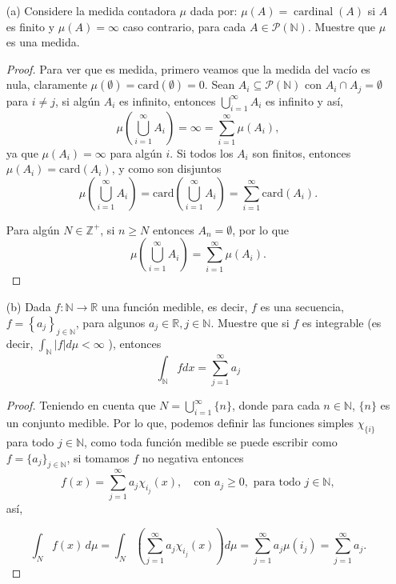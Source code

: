 \begin{itemize}
\begin{itemize}
\item[(a)] Considere la medida contadora $\mu$ dada por: $\mu(A)=\operatorname{cardinal}(A)$ si $A$ es finito y $\mu(A)=\infty$ caso contrario, para cada $A \in \mathcal{P}(\mathbb{N})$. Muestre que $\mu$ es una medida.
\begin{proof}
Para ver que es medida, primero veamos que la medida del vacío es nula, claramente $\mu(\emptyset) = \text{card}(\emptyset) = 0.$ Sean \( A_i \subseteq \mathcal{P}(\mathbb{N}) \) con \( A_i \cap A_j = \emptyset \) para \( i \neq j \), si algún \( A_i \) es infinito, entonces \( \bigcup_{i=1}^{\infty} A_i \) es infinito y así,
\[ \mu\left(\bigcup_{i=1}^{\infty} A_i\right) = \infty = \sum_{i=1}^{\infty} \mu(A_i), \]
ya que \( \mu(A_i) = \infty \) para algún \( i \). Si  todos los \( A_i \) son finitos, entonces \( \mu(A_i) = \text{card}(A_i) \), y como son disjuntos
\[ \mu\left(\bigcup_{i=1}^{\infty} A_i\right) = \text{card}\left(\bigcup_{i=1}^{\infty} A_i\right) = \sum_{i=1}^{\infty} \text{card}(A_i). \]

Para algún \( N \in \mathbb{Z}^+ \), si \( n \geq N \) entonces \( A_n = \emptyset \), por lo que
\[ \mu\left(\bigcup_{i=1}^{\infty} A_i\right)= \sum_{i=1}^{\infty} \mu(A_i). \]
              
\end{proof}
                

\item[(b)] Dada $f: \mathbb{N} \rightarrow \mathbb{R}$ una función medible, es decir, $f$ es una secuencia, $f=\left\{a_j\right\}_{j \in \mathbb{N}}$, para algunos $a_j \in \mathbb{R}, j \in \mathbb{N}$. Muestre que si $f$ es integrable (es decir, $\int_{\mathbb{N}}|f| d \mu<\infty$ ), entonces
$$
\int_{\mathbb{N}} f d x=\sum_{j=1}^{\infty} a_j
$$
\begin{proof}

Teniendo en cuenta que \( N = \bigcup^{\infty}_{i=1} \{n\} \), donde para cada \( n \in \mathbb{N} \), \( \{n\} \) es un conjunto medible. Por lo que, podemos definir las funciones simples \( \chi_{\{i\}} \) para todo \( j \in \mathbb{N} \), como toda función medible se puede escribir como \( f = \{a_j\}_{j \in \mathbb{N}} \), si tomamos \( f \) no negativa entonces
\[
f(x) = \sum_{j=1}^{\infty} a_j \chi_{i_j}(x), \quad \text{con } a_j \geq 0, \text{ para todo } j \in \mathbb{N},
\]
así,

\[
\int_N f(x) \, d\mu = \int_N \left( \sum_{j=1}^{\infty} a_j \chi_{i_j}(x) \right) d\mu = \sum_{j=1}^{\infty} a_j \mu(i_j) = \sum_{j=1}^{\infty} a_j.
\]


\end{proof}
\end{itemize}
\end{itemize}

